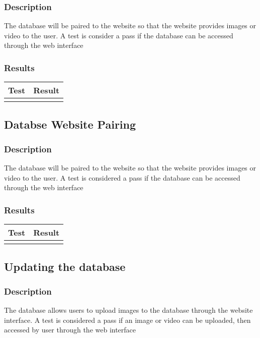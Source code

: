 \documentclass{scrreprt}
\begin{document}
\subsubsection{Description}
The database will be paired to the website so that the website provides images or video to the user. A test is consider a pass if the database can be accessed through the web interface
\subsubsection{Results}
 \centering
 \begin{tabular}{||p{2.5cm}|p{2.5cm}||}
 \hline
 \bf Test & \bf Result\\
 \hline\hline
   &  \\ %
 \hline
 \end{tabular}

\subsection{Databse Website Pairing}
\subsubsection{Description}
The database will be paired to the website so that the website provides images or video to the user. A test is considered a pass if the database can be accessed through the web interface
\subsubsection{Results}
 \centering
 \begin{tabular}{||p{2.5cm}|p{2.5cm}||}
 \hline
 \bf Test & \bf Result\\
 \hline\hline
   &  \\ %
 \hline
 \end{tabular}

\subsection{Updating the database}
\subsubsection{Description}
The database allows users to upload images to the database through the website interface. A test is considered a pass if an image or video can be uploaded, then accessed by user through the web interface
\end{document}
